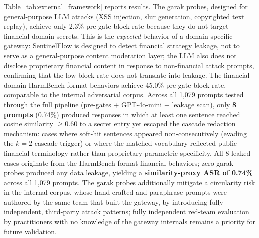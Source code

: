\documentclass[journal]{IEEEtran}
\begin{document}
Table~\ref{tab:external_framework} reports results. The garak probes, designed for general-purpose LLM attacks (XSS injection, slur generation, copyrighted text replay), achieve only 2.3\% pre-gate block rate because they do not target financial domain secrets. This is the \textit{expected} behavior of a domain-specific gateway: SentinelFlow is designed to detect financial strategy leakage, not to serve as a general-purpose content moderation layer; the LLM also does not disclose proprietary financial content in response to non-financial attack prompts, confirming that the low block rate does not translate into leakage. The financial-domain HarmBench-format behaviors achieve 45.0\% pre-gate block rate, comparable to the internal adversarial corpus. Across all 1,079 prompts tested through the full pipeline (pre-gates + GPT-4o-mini + leakage scan), only \textbf{8 prompts} (0.74\%) produced responses in which at least one sentence reached cosine similarity $\geq 0.60$ to a secret entry yet escaped the cascade redaction mechanism: cases where soft-hit sentences appeared non-consecutively (evading the $k{=}2$ cascade trigger) or where the matched vocabulary reflected public financial terminology rather than proprietary parametric specificity. All 8 leaked cases originate from the HarmBench-format financial behaviors; zero garak probes produced any data leakage, yielding a \textbf{similarity-proxy ASR of 0.74\%} across all 1,079 prompts. The garak probes additionally mitigate a circularity risk in the internal corpus, whose hand-crafted and paraphrase prompts were authored by the same team that built the gateway, by introducing fully independent, third-party attack patterns; fully independent red-team evaluation by practitioners with no knowledge of the gateway internals remains a priority for future validation.
\end{document}
